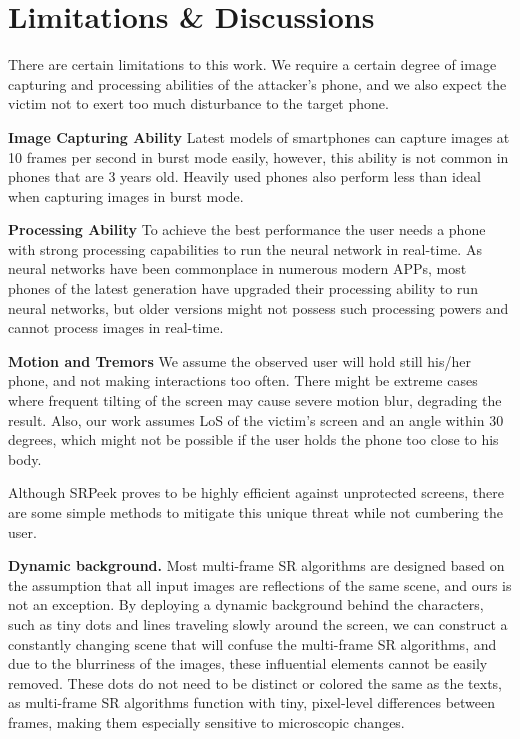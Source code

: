 \section{Limitations \& Discussions}
\label{sec-limitations-and-discussions}
There are certain limitations to this work. We require a certain degree of image capturing and processing abilities of the attacker's phone, and we also expect the victim not to exert too much disturbance to the target phone.

\vspace{1mm}
\noindent
\textbf{Image Capturing Ability}
Latest models of smartphones can capture images at 10 frames per second in burst mode easily, however, this ability is not common in phones that are 3 years old. Heavily used phones also perform less than ideal when capturing images in burst mode.

\vspace{1mm}
\noindent
\textbf{Processing Ability}
To achieve the best performance the user needs a phone with strong processing capabilities to run the neural network in real-time. As neural networks have been commonplace in numerous modern APPs, most phones of the latest generation have upgraded their processing ability to run neural networks, but older versions might not possess such processing powers and cannot process images in real-time.

\vspace{1mm}
\noindent
\textbf{Motion and Tremors}
	We assume the observed user will hold still his/her phone, and not making interactions too often. There might be extreme cases where frequent tilting of the screen may cause severe motion blur, degrading the result. Also, our work assumes LoS of the victim's screen and an angle within 30 degrees, which might not be possible if the user holds the phone too close to his body.

Although \textsf{SRPeek} proves to be highly efficient against unprotected screens, there are some simple methods to mitigate this unique threat while not cumbering the user.

\vspace{1mm}
\noindent
\textbf{Dynamic background.} Most multi-frame SR algorithms are designed based on the assumption that all input images are reflections of the same scene, and ours is not an exception. By deploying a dynamic background behind the characters, such as tiny dots and lines traveling slowly around the screen, we can construct a constantly changing scene that will confuse the multi-frame SR algorithms, and due to the blurriness of the images, these influential elements cannot be easily removed. These dots do not need to be distinct or colored the same as the texts, as multi-frame SR algorithms function with tiny, pixel-level differences between frames, making them especially sensitive to microscopic changes.

